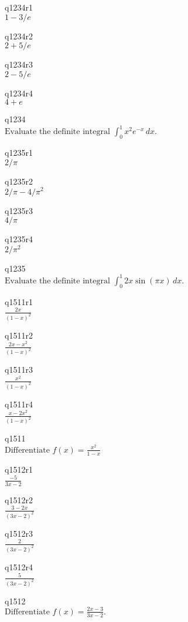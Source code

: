 q1234r1\\
\(\displaystyle 1 - 3/e \)

q1234r2\\
\(\displaystyle 2 + 5/e \)

q1234r3\\
\(\displaystyle 2 - 5/e \)

q1234r4\\
\(\displaystyle 4 + e \)

q1234\\
\(\displaystyle \text{Evaluate the definite integral } \int_0^1 x^2 e^{-x}\,dx. \)

q1235r1\\
\(\displaystyle 2/\pi \)

q1235r2\\
\(\displaystyle 2/\pi - 4/\pi^2 \)

q1235r3\\
\(\displaystyle 4/\pi \)

q1235r4\\
\(\displaystyle 2/\pi^2 \)

q1235\\
\(\displaystyle \text{Evaluate the definite integral } \int_0^1 2x \sin(\pi x)\,dx. \)

q1511r1\\
\(\displaystyle \frac{2x}{(1-x)^2} \)

q1511r2\\
\(\displaystyle \frac{2x-x^2}{(1-x)^2} \)

q1511r3\\
\(\displaystyle \frac{x^2}{(1-x)^2} \)

q1511r4\\
\(\displaystyle \frac{x-2x^2}{(1-x)^2} \)

q1511\\
\(\displaystyle \text{Differentiate } f(x) = \frac{x^2}{1-x} \)

q1512r1\\
\(\displaystyle \frac{-5}{3x-2} \)

q1512r2\\
\(\displaystyle \frac{3-2x}{(3x-2)^2} \)

q1512r3\\
\(\displaystyle \frac{2}{(3x-2)^2} \)

q1512r4\\
\(\displaystyle \frac{5}{(3x-2)^2} \)

q1512\\
\(\displaystyle \text{Differentiate } f(x) = \frac{2x-3}{3x-2}. \)

